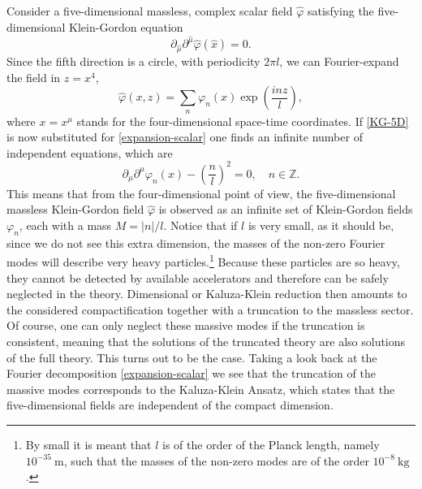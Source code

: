 \documentclass[12pt,twoside]{book}
\begin{document}
Consider a five-dimensional massless, complex scalar field $\hat{\varphi}$ satisfying the five-dimensional Klein-Gordon equation
\begin{equation}\label{KG-5D}
\partial_{\hat{\mu}} \partial^{\hat{\mu}}\hat{\varphi}(\hat{x}) = 0.
\end{equation}
Since the fifth direction is a circle, with periodicity $2\pi l$, we can Fourier-expand the field in $z = x^{4}$,
\begin{equation}\label{expansion-scalar}
\hat{\varphi}(x,z) = \sum_{n} \varphi_{n}(x) \exp \left( \frac{i n z}{l} \right),
\end{equation}
where $x = x^{\mu}$ stands for the four-dimensional space-time coordinates. If \eqref{KG-5D} is now substituted for \eqref{expansion-scalar} one finds an infinite number of independent equations, which are
\begin{equation}
\partial_{\mu}\partial^{\mu}\varphi_{n}(x) - \left( \frac{n}{l} \right)^{2} = 0, \quad n\in\mathbb{Z}.
\end{equation} 
This means that from the four-dimensional point of view, the five-dimensional massless Klein-Gordon field $\hat{\varphi}$ is observed as an infinite set of Klein-Gordon fields $\varphi_{n}$, each with a mass $M = |n|/l$. Notice that if $l$ is very small, as it should be, since we do not see this extra dimension, the masses of the non-zero Fourier modes will describe very heavy particles.\footnote{
By small it is meant that $l$ is of the order of the Planck length, namely $10^{-35} \ \mathrm{m}$, such that the masses of the non-zero modes are of the order $10^{-8}\ \mathrm{kg}$.
}
Because these particles are so heavy, they cannot be detected by available accelerators and therefore can be safely neglected in the theory. Dimensional or Kaluza-Klein reduction then amounts to the considered compactification together with a truncation to the massless sector. Of course, one can only neglect these massive modes if the truncation is consistent, meaning that the solutions of the truncated theory are also solutions of the full theory. This turns out to be the case. Taking a look back at the Fourier decomposition \eqref{expansion-scalar} we see that the truncation of the massive modes corresponds to the Kaluza-Klein Ansatz, which states that the five-dimensional fields are independent of the compact dimension.
\end{document}
